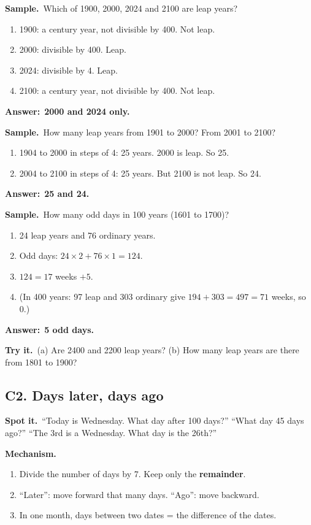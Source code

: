 \documentclass[11pt,a4paper]{article}
\let\oldsubsection\subsection
\renewcommand{\subsection}{\needspace{9\baselineskip}\oldsubsection}
\newcommand{\spot}{\textbf{\color{ember}Spot it.}\ }
\newcommand{\mech}{\textbf{\color{ember}Mechanism.}\ }
\newif\ifkeepsamp
\newcommand{\ans}[1]{\par\nopagebreak\noindent\textbf{\color{ember}Answer:}\ \textbf{#1}\par}
\newcommand{\samp}{\ifkeepsamp\needspace{4\baselineskip}\fi\textbf{\color{ember}Sample.}\ }
\newcommand{\tryit}[1]{\textbf{\color{ember}Try it.}\ #1}
\begin{document}
\samp Which of 1900, 2000, 2024 and 2100 are leap years?
\begin{enumerate}
\item 1900: a century year, not divisible by 400. Not leap.
\item 2000: divisible by 400. Leap.
\item 2024: divisible by 4. Leap.
\item 2100: a century year, not divisible by 400. Not leap.
\end{enumerate}
\ans{2000 and 2024 only.}

\samp How many leap years from 1901 to 2000? From 2001 to 2100?
\begin{enumerate}
\item 1904 to 2000 in steps of 4: 25 years. 2000 is leap. So 25.
\item 2004 to 2100 in steps of 4: 25 years. But 2100 is not leap. So 24.
\end{enumerate}
\ans{25 and 24.}

\samp How many odd days in 100 years (1601 to 1700)?
\begin{enumerate}
\item 24 leap years and 76 ordinary years.
\item Odd days: $24 \times 2 + 76 \times 1 = 124$.
\item $124 = 17$ weeks $+ 5$.
\item (In 400 years: 97 leap and 303 ordinary give $194 + 303 = 497 = 71$ weeks, so 0.)
\end{enumerate}
\ans{5 odd days.}

\tryit (a) Are 2400 and 2200 leap years? (b) How many leap years are there from 1801 to 1900?

\subsection{C2. Days later, days ago}
\spot ``Today is Wednesday. What day after 100 days?'' ``What day 45 days ago?'' ``The 3rd is a Wednesday. What day is the 26th?''

\mech
\begin{enumerate}
\item Divide the number of days by 7. Keep only the \textbf{remainder}.
\item ``Later'': move forward that many days. ``Ago'': move backward.
\item In one month, days between two dates = the difference of the dates.
\end{enumerate}
\end{document}
